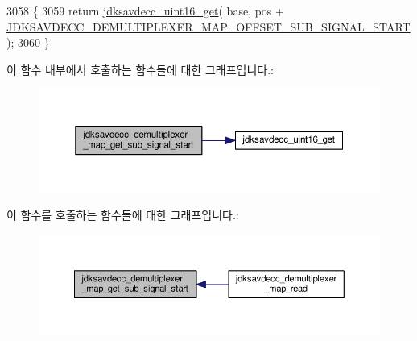 \begin{DoxyCode}
3058 \{
3059     \textcolor{keywordflow}{return} \hyperlink{group__endian_ga3fbbbc20be954aa61e039872965b0dc9}{jdksavdecc\_uint16\_get}( base, pos + 
      \hyperlink{group__demultiplexer__map_gafa458221cc97b8f53204b6311537ca2e}{JDKSAVDECC\_DEMULTIPLEXER\_MAP\_OFFSET\_SUB\_SIGNAL\_START} );
3060 \}
\end{DoxyCode}


이 함수 내부에서 호출하는 함수들에 대한 그래프입니다.\+:
\nopagebreak
\begin{figure}[H]
\begin{center}
\leavevmode
\includegraphics[width=350pt]{group__demultiplexer__map_gaeac54a26ea375cbe0d5b2b8a123bb6a1_cgraph}
\end{center}
\end{figure}




이 함수를 호출하는 함수들에 대한 그래프입니다.\+:
\nopagebreak
\begin{figure}[H]
\begin{center}
\leavevmode
\includegraphics[width=350pt]{group__demultiplexer__map_gaeac54a26ea375cbe0d5b2b8a123bb6a1_icgraph}
\end{center}
\end{figure}


